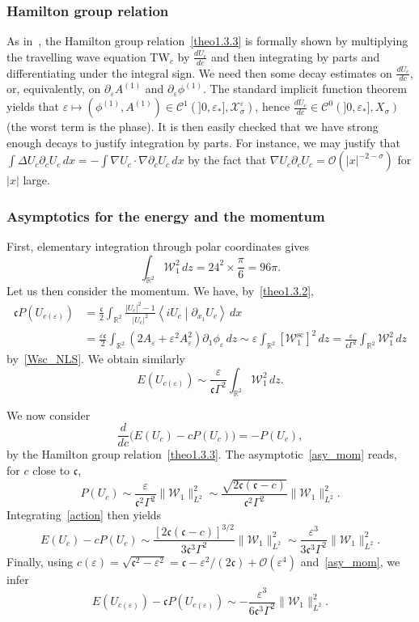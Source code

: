 \documentclass[AHL,Unicode,longabstracts,published]{cedram}
\newcommand*\p{\partial}
\newcommand*\R{\mathbb R}
\renewcommand{\sc}{\mathrm{sc}}
\newcommand*\BO{\mathcal{O}}
\newcommand*\BC{\mathcal{C}}
\newcommand*\BW{\mathcal{W}}
\newcommand*\BX{\mathcal{X}}
\newcommand*\cs{{\mathfrak c}}
\newcommand*\e{\varepsilon}
\newcommand*\s{\sigma}
\begin{document}
\subsubsection{Hamilton group relation}

As in~\cite{JR}, the Hamilton group relation~\eqref{theo1.3.3} is formally shown by multiplying the travelling wave equation TW$_c$ by $ \frac{d U_c}{dc} $ and then integrating by parts and differentiating under the integral sign. We need then some decay estimates on $ \frac{d U_c}{dc} $, or, equivalently, on $ \p_\e A^{(1)} $ and $ \p_\e \phi^{(1)} $. The standard implicit function theorem yields that $ \e \mapsto (\phi^{(1)}, A^{(1)}) \in \BC^1 (]0,\e_*], \BX^\e_\s) $, hence $ \frac{d U_c}{dc} \in \BC^0 (]0,\e_*], X_\s) $ (the worst term is the phase). It is then easily checked that we have strong enough decays to justify integration by parts. For instance, we may justify that $ \int \Delta U_c \p_c U_c \, dx = - \int \nabla U_c \cdot \nabla \p_c U_c \, dx $ by the fact that $ \nabla U_c \p_c U_c = \BO (|x|^{- 2- \s}) $ for $|x| $ large.



\subsubsection{Asymptotics for the energy and the momentum}

First, elementary integration through polar coordinates gives
\[
\int_{\R^2} \BW_1^2 \, dz = 24^2 \times \frac{\pi}{6} = 96 \pi.
\]
Let us then consider the momentum. We have, by~\eqref{theo1.3.2},
\begin{equation}\label{asy_mom}
\begin{split}
\cs P(U_{c(\e)}) & = \frac{\cs}{2} \int_{\R^2} \frac{ \lvert U_c \rvert^2 - 1 }{ \lvert U_c \rvert^2 } \left\langle i U_c \middle| \p_{x_1} U_c \right\rangle \, dx
 \\ & = \frac{ \e \cs}{2} \int_{\R^2} \left(2 A_\e + \e^2 A_\e^2\right) \p_1 \phi_\e \, dz
\sim \e \int_{\R^2} \left[\BW_1^{\sc}\right]^2 \, dz = \frac{\e }{\cs \Gamma^2 } \int_{\R^2} \BW_1^2 \, dz
\end{split}
\end{equation}
by~\eqref{Wsc_NLS}. We obtain similarly
\[
E(U_{c(\e)}) \sim \frac{\e }{\cs \Gamma^2 } \int_{\R^2} \BW_1^2 \, dz.
\]


We now consider
\begin{equation}\label{action}
\frac{d}{dc} \big(E(U_c) - c P(U_c) \big) = - P(U_c),
\end{equation}
by the Hamilton group relation~\eqref{theo1.3.3}. The asymptotic~\eqref{asy_mom} reads, for $c $ close to $ \cs $,
\[
P(U_{c}) \sim \frac{ \e }{\cs^2 \Gamma^2 } \| \BW_1 \|_{L^2}^2
\sim \frac{ \sqrt{ 2\cs (\cs - c)} }{ \cs^2 \Gamma^2 } \| \BW_1 \|_{L^2}^2.
\]
Integrating~\eqref{action} then yields
\[
E(U_c) - c P(U_c)
\sim \frac{ [2\cs (\cs - c)]^{3/2} }{ 3 \cs^3 \Gamma^2 } \| \BW_1 \|_{L^2}^2
\sim \frac{ \e^{3} }{ 3 \cs^3 \Gamma^2 } \| \BW_1 \|_{L^2}^2.
\]
Finally, using $ c(\e) = \sqrt{ \cs^2 - \e^2 } = \cs - \e^2 /(2\cs) + \BO(\e^4) $ and~\eqref{asy_mom}, we infer
\[
E(U_{c(\e)}) - \cs P (U_{c(\e)})
\sim - \frac{\e^3}{6 \cs^3 \Gamma^2} \| \BW_1 \|_{L^2}^2.
\]
\end{document}

